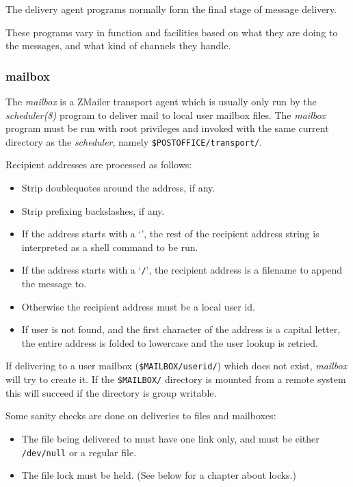 
The delivery agent programs normally form the final stage of message delivery.

These programs vary in function and facilities based on what they are
doing to the messages, and what kind of channels they handle.


\subsubsection{mailbox}

The {\em mailbox\/} is a ZMailer transport agent which is usually
only run by the {\em scheduler(8)\/} program to deliver mail to
local user mailbox files. The {\em mailbox\/} program must be
run with root privileges and invoked with the same current 
directory as the {\em scheduler\/}, namely 
{\tt \$POSTOFFICE/transport/}.

Recipient addresses are processed  as follows: 

\begin{itemize}
\item Strip doublequotes around the address, if any. 
\item Strip prefixing backslashes, if any.  
\item If the address starts with a `{\tt {\verbar}}', the rest of the recipient address 
string is interpreted as  a shell command to be run. 
\item If the address starts with a `{\tt /}', the recipient address is a  filename
to append the message to. 
\item Otherwise the recipient address must be a local user id. 
\item If user is not  found,  and the first character of the address is a capital 
letter, the entire address is folded to lowercase and the user lookup is  retried.
\end{itemize}


If delivering to a user mailbox ({\tt \$MAILBOX/userid/}) which
does not exist, {\em mailbox\/} will try to create it. If the
{\tt \$MAILBOX/} directory is mounted from a remote system this
will succeed if the directory is group writable.

Some sanity checks are done on deliveries to files and mailboxes:

\begin{itemize}
\item The file being delivered to must have one link only, and must be either 
{\tt /dev/null} or a regular file.
\item The file lock must be held. (See below for a chapter about locks.)  
\end{itemize}



